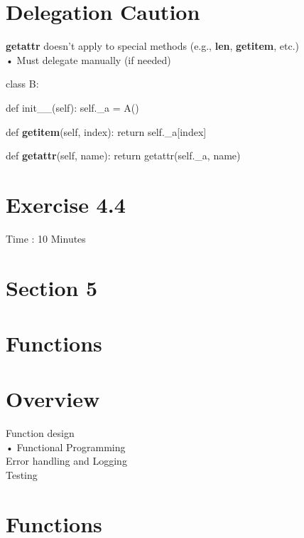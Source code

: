 \documentclass[
  letterpaper,
  DIV=11,
  numbers=noendperiod]{scrreprt}
\begin{document}

\chapter{Delegation Caution}\label{delegation-caution}

\textbf{getattr} doesn't apply to special methods (e.g., \textbf{len},
\textbf{getitem}, etc.)\\
• Must delegate manually (if needed)

class B:

def init\_\_(self): self.\_a = A()

def \textbf{getitem}(self, index): return self.\_a{[}index{]}

def \textbf{getattr}(self, name): return getattr(self.\_a, name)


\chapter{Exercise 4.4}\label{exercise-4.4}

Time : 10 Minutes


\chapter{Section 5}\label{section-5}


\chapter{Functions}\label{functions}


\chapter{Overview}\label{overview-2}

Function design\\
• Functional Programming\\
Error handling and Logging\\
Testing


\chapter{Functions}\label{functions-1}
\end{document}

